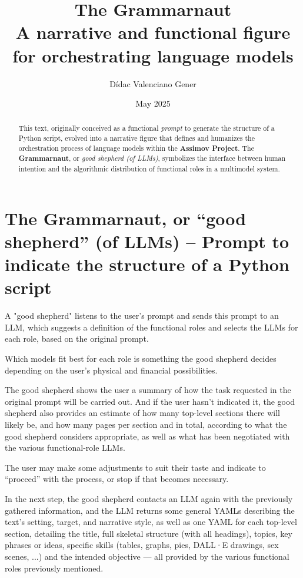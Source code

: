 \documentclass[12pt]{article}
\title{The Grammarnaut\\\large A narrative and functional figure for orchestrating language models}
\author{Dídac Valenciano Gener}
\date{May 2025}
\begin{document}
	
	\maketitle
	
	\begin{abstract}
		\noindent	This text, originally conceived as a functional \textit{prompt} to generate the structure of a Python script, evolved into a narrative figure that defines and humanizes the orchestration process of language models within the \textbf{Assimov Project}. The \textbf{Grammarnaut}, or \textit{good shepherd (of LLMs)}, symbolizes the interface between human intention and the algorithmic distribution of functional roles in a multimodel system.
	\end{abstract}
	
	\section*{The Grammarnaut, or “good shepherd” (of LLMs) – Prompt to indicate the structure of a Python script}
	
	A "good shepherd" listens to the user's prompt and sends this prompt to an LLM, which suggests a definition of the functional roles and selects the LLMs for each role, based on the original prompt.
	
	Which models fit best for each role is something the good shepherd decides depending on the user's physical and financial possibilities.
	
	The good shepherd shows the user a summary of how the task requested in the original prompt will be carried out. And if the user hasn’t indicated it, the good shepherd also provides an estimate of how many top-level sections there will likely be, and how many pages per section and in total, according to what the good shepherd considers appropriate, as well as what has been negotiated with the various functional-role LLMs.
	
	The user may make some adjustments to suit their taste and indicate to “proceed” with the process, or stop if that becomes necessary.\\
	
	\medskip
	
	In the next step, the good shepherd contacts an LLM again with the previously gathered information, and the LLM returns some general YAMLs describing the text’s setting, target, and narrative style, as well as one YAML for each top-level section, detailing the title, full skeletal structure (with all headings), topics, key phrases or ideas, specific skills (tables, graphs, pies, DALL·E drawings, sex scenes, ...) and the intended objective — all provided by the various functional roles previously mentioned.
	
\end{document}
